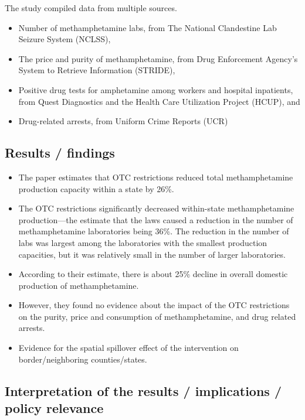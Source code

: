 \documentclass[
  11pt,
]{article}
\providecommand{\tightlist}{%
  \setlength{\itemsep}{0pt}\setlength{\parskip}{0pt}}
\begin{document}
The study compiled data from multiple sources.

\begin{itemize}
\tightlist
\item
  Number of methamphetamine labs, from The National Clandestine Lab
  Seizure System (NCLSS),\\
\item
  The price and purity of methamphetamine, from Drug Enforcement
  Agency's System to Retrieve Information (STRIDE),\\
\item
  Positive drug tests for amphetamine among workers and hospital
  inpatients, from Quest Diagnostics and the Health Care Utilization
  Project (HCUP), and\\
\item
  Drug-related arrests, from Uniform Crime Reports (UCR)
\end{itemize}

\hypertarget{results-findings}{%
\subsection*{Results / findings}\label{results-findings}}

\begin{itemize}
\item
  The paper estimates that OTC restrictions reduced total
  methamphetamine production capacity within a state by 26\%.
\item
  The OTC restrictions significantly decreased within-state
  methamphetamine production---the estimate that the laws caused a
  reduction in the number of methamphetamine laboratories being 36\%.
  The reduction in the number of labs was largest among the laboratories
  with the smallest production capacities, but it was relatively small
  in the number of larger laboratories.
\item
  According to their estimate, there is about 25\% decline in overall
  domestic production of methamphetamine.
\item
  However, they found no evidence about the impact of the OTC
  restrictions on the purity, price and consumption of methamphetamine,
  and drug related arrests.
\item
  Evidence for the spatial spillover effect of the intervention on
  border/neighboring counties/states.
\end{itemize}

\hypertarget{interpretation-of-the-results-implications-policy-relevance}{%
\subsection*{Interpretation of the results / implications / policy
relevance}\label{interpretation-of-the-results-implications-policy-relevance}}
\end{document}
